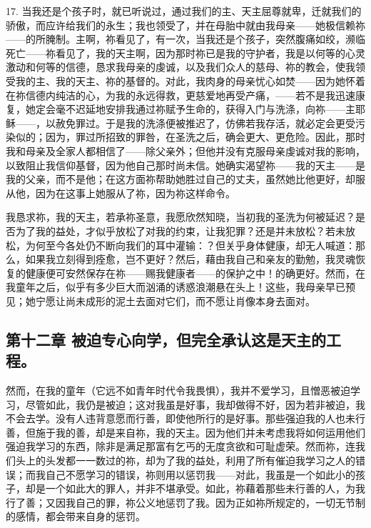 17. 当我还是个孩子时，就已听说过，通过我们的主、天主屈尊就卑，迁就我们的骄傲，而应许给我们的永生；我也领受了，并在母胎中就由我母亲——她极信赖祢——的所腌制。主啊，祢看见了，有一次，当我还是个孩子，突然腹痛如绞，濒临死亡——祢看见了，我的天主啊，因为那时祢已是我的守护者，我是以何等的心灵激动和何等的信德，恳求我母亲的虔诚，以及我们众人的慈母、祢的教会，使我领受我的主、我的天主、祢的基督的。对此，我肉身的母亲忧心如焚——因为她怀着在祢信德内纯洁的心，为我的永远得救，更慈爱地再受产痛，——若不是我迅速康复，她定会毫不迟延地安排我通过祢赋予生命的，获得入门与洗涤，向祢——主耶稣——，以赦免罪过。于是我的洗涤便被推迟了，仿佛若我存活，就必定会更受污染似的；因为，罪过所招致的罪咎，在圣洗之后，确会更大、更危险。因此，那时我和母亲及全家人都相信了——除父亲外；但他并没有克服母亲虔诚对我的影响，以致阻止我信仰基督，因为他自己那时尚未信。她确实渴望祢——我的天主——是我的父亲，而不是他；在这方面祢帮助她胜过自己的丈夫，虽然她比他更好，却服从他，因为在这事上她服从了祢，因为祢这样命令。\par

我恳求祢，我的天主，若承祢圣意，我愿欣然知晓，当初我的圣洗为何被延迟？是否为了我的益处，才似乎放松了对我的约束，让我犯罪？还是并未放松？若未放松，为何至今各处仍不断向我们的耳中灌输：？但关乎身体健康，却无人喊道：那么，如果我立刻得到痊愈，岂不更好？然后，藉由我自己和亲友的勤勉，我灵魂恢复的健康便可安然保存在祢——赐我健康者——的保护之中！的确更好。然而，在我童年之后，似乎有多少巨大而汹涌的诱惑浪潮悬在头上！这些，我母亲早已预见；她宁愿让尚未成形的泥土去面对它们，而不愿让肖像本身去面对。\par


\subsection{第十二章 被迫专心向学，但完全承认这是天主的工程。}

然而，在我的童年（它远不如青年时代令我畏惧），我并不爱学习，且憎恶被迫学习，尽管如此，我仍是被迫；这对我虽是好事，我却做得不好，因为若非被迫，我不会去学。没有人违背意愿而行善，即使他所行的是好事。那些强迫我的人也未行善，但施于我的善，却是来自祢，我的天主。因为他们并未考虑我将如何运用他们强迫我学习的东西，除非是满足那富有乞丐的无度贪欲和可耻虚荣。然而祢，连我们头上的头发都一一数过的祢，却为了我的益处，利用了所有催迫我学习之人的错误；而我自己不愿学习的错误，祢则用以惩罚我——对此，我虽是一个如此小的孩子，却是一个如此大的罪人，并非不堪承受。如此，祢藉着那些未行善的人，为我行了善；又因我自己的罪，祢公义地惩罚了我。因为正如祢所规定的，一切无节制的感情，都会带来自身的惩罚。\par

